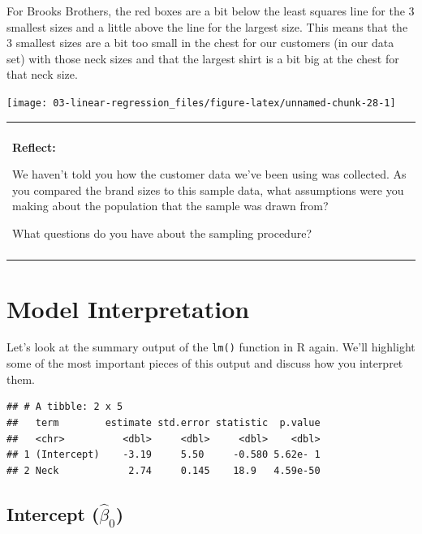 \documentclass[
]{book}
\newenvironment{Shaded}{\begin{snugshade}}{\end{snugshade}}
\newcommand{\KeywordTok}[1]{\textcolor[rgb]{0.13,0.29,0.53}{\textbf{#1}}}
\newcommand{\NormalTok}[1]{#1}
\newcommand{\OperatorTok}[1]{\textcolor[rgb]{0.81,0.36,0.00}{\textbf{#1}}}
\newcommand{\StringTok}[1]{\textcolor[rgb]{0.31,0.60,0.02}{#1}}
\newenvironment{reflect}
{
    \begin{center}
    
    \begin{tabular}{|p{0.8\textwidth}|}
    \rowcolor{LightBlue}
    \hline\\
    \rowcolor{LightBlue}
    \textbf{Reflect:}
}
{
    \\\rowcolor{LightBlue}
    \\\hline
    \end{tabular} 
    \end{center}
}
\begin{document}
For Brooks Brothers, the red boxes are a bit below the least squares line for the 3 smallest sizes and a little above the line for the largest size. This means that the 3 smallest sizes are a bit too small in the chest for our customers (in our data set) with those neck sizes and that the largest shirt is a bit big at the chest for that neck size.

\begin{center}\texttt{[image: 03-linear-regression\_files/figure-latex/unnamed-chunk-28-1]} \end{center}

\begin{reflect}
We haven't told you how the customer data we've been using was
collected. As you compared the brand sizes to this sample data, what
assumptions were you making about the population that the sample was
drawn from?

What questions do you have about the sampling procedure?
\end{reflect}

\hypertarget{model-interpretation}{%
\section{Model Interpretation}\label{model-interpretation}}

Let's look at the summary output of the \texttt{lm()} function in R again. We'll highlight some of the most important pieces of this output and discuss how you interpret them.

\begin{Shaded}
\end{Shaded}

\begin{verbatim}
## # A tibble: 2 x 5
##   term        estimate std.error statistic  p.value
##   <chr>          <dbl>     <dbl>     <dbl>    <dbl>
## 1 (Intercept)    -3.19     5.50     -0.580 5.62e- 1
## 2 Neck            2.74     0.145    18.9   4.59e-50
\end{verbatim}

\hypertarget{intercept-hatbeta_0}{%
\subsection{\texorpdfstring{Intercept (\(\hat{\beta}_0\))}{Intercept (\textbackslash hat\{\textbackslash beta\}\_0)}}\label{intercept-hatbeta_0}}
\end{document}
